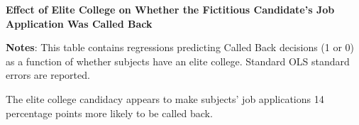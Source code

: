 \documentclass[11pt]{article}
\begin{document}
\begin{table}[htbp]
\caption{\textbf{Effect of Elite College on Whether the Fictitious Candidate's Job Application Was Called Back}
\label{tab:EngApproach}}
\flushleft
	
    \flushleft
    \begin{footnotesize}
    \textbf{Notes}: This table contains regressions predicting Called Back decisions (1 or 0) as a function of whether subjects have an elite college. Standard OLS standard errors are reported.  
    \end{footnotesize}
\end{table}

The elite college candidacy appears to make subjects’ job applications 14 percentage points more likely to be called back.
\end{document}
